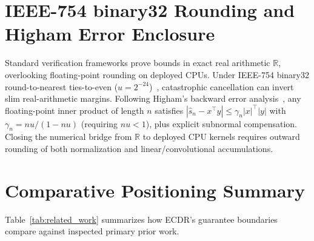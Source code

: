 \documentclass[11pt,oneside,a4paper]{report}
\newcommand{\R}{\mathbb{R}}
\newcommand{\abs}[1]{\left\lvert #1\right\rvert}
\newcommand{\code}[1]{{\small\upshape\ttfamily #1}}
\theoremstyle{remark}
\begin{document}
\section{IEEE-754 \code{binary32} Rounding and Higham Error Enclosure}
Standard verification frameworks prove bounds in exact real arithmetic $\R$, overlooking floating-point rounding on deployed CPUs. Under IEEE-754 \code{binary32} round-to-nearest ties-to-even ($u = 2^{-24}$)~\cite{ieee754}, catastrophic cancellation can invert slim real-arithmetic margins. Following Higham's backward error analysis~\cite{higham2002}, any floating-point inner product of length $n$ satisfies $\abs{\widehat{s}_n - x^\top y} \le \gamma_n \abs{x}^\top \abs{y}$ with $\gamma_n = n u / (1 - n u)$ (requiring $n u < 1$), plus explicit subnormal compensation. Closing the numerical bridge from $\R$ to deployed CPU kernels requires outward rounding of both normalization and linear/convolutional accumulations.

\section{Comparative Positioning Summary}
Table~\ref{tab:related_work} summarizes how ECDR's guarantee boundaries compare against inspected primary prior work.
\end{document}
